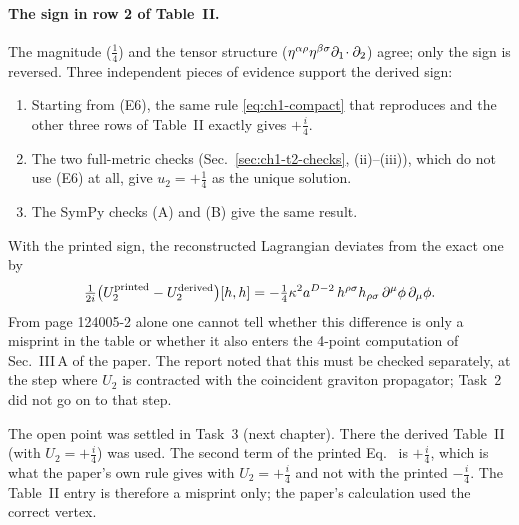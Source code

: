\paragraph{The sign in row 2 of Table~II.} The magnitude ($\tfrac14$) and the
tensor structure ($\eta^{\alpha\rho}\eta^{\beta\sigma}\partial_1\!\cdot\partial_2$) agree; only the
sign is reversed. Three independent pieces of evidence support the derived
sign:
\begin{enumerate}[leftmargin=1.6em]
\item Starting from (E6), the same rule \eqref{eq:ch1-compact} that reproduces
 and the other three rows of Table~II exactly gives $+\tfrac i4$.
\item The two full-metric checks (Sec.~\ref{sec:ch1-t2-checks}, (ii)--(iii)),
which do not use (E6) at all, give $u_2=+\tfrac14$ as the unique solution.
\item The SymPy checks (A) and (B) give the same result.
\end{enumerate}
With the printed sign, the reconstructed Lagrangian deviates from the exact one
by
\begin{equation}
\tfrac1{2i}\big(U_2^{\rm printed}-U_2^{\rm derived}\big)[h,h]=-\tfrac14\kappa^2a^{D-2}\,h^{\rho\sigma}h_{\rho\sigma}\,\partial^\mu\phi\,\partial_\mu\phi .
\label{eq:ch1-U2dev}
\end{equation}
From page 124005-2 alone one cannot tell whether this difference is only a
misprint in the table or whether it also enters the 4-point computation of
Sec.~III\,A of the paper. The report noted that this must be checked
separately, at the step where $U_2$ is contracted with the coincident graviton
propagator; Task~2 did not go on to that step.

\begin{notebox}
The open point was settled in Task~3 (next chapter). There the derived Table~II
(with $U_2=+\tfrac i4$) was used. The second term of the printed Eq.~
is $+\tfrac i4$, which is what the paper's own rule gives with $U_2=+\tfrac i4$
and not with the printed $-\tfrac i4$. The Table~II entry is therefore a
misprint only; the paper's calculation used the correct vertex.
\end{notebox}


